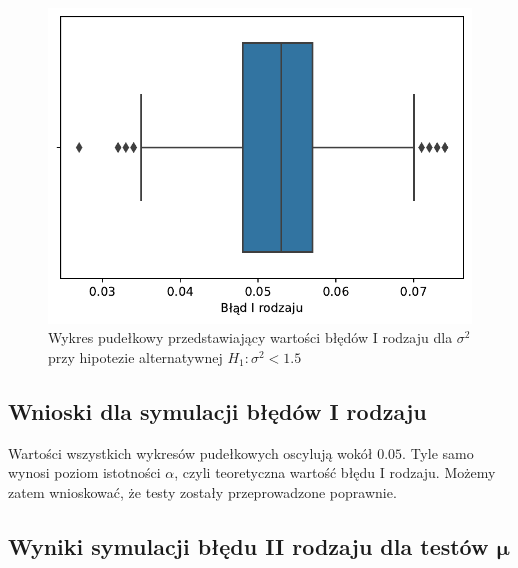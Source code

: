 \documentclass[12pt]{mwart}
\begin{document}
	
	\begin{figure}[H]
	\begin{center}
		\includegraphics[scale=0.6]{box6.pdf}
		\caption{Wykres pudełkowy przedstawiający wartości błędów I rodzaju dla $\sigma^2$ przy hipotezie alternatywnej $H_1 \colon \sigma^2 < 1.5$}
	\end{center}
	\end{figure}
	
	
	\subsection{Wnioski dla symulacji błędów I rodzaju}
	\noindent Wartości wszystkich wykresów pudełkowych oscylują wokół $0.05$. Tyle samo wynosi poziom istotności $\alpha$, czyli teoretyczna wartość błędu I rodzaju. Możemy zatem wnioskować, że testy zostały przeprowadzone poprawnie.
	
	
	
	\subsection{Wyniki symulacji błędu II rodzaju dla testów $\bm{\mu}$}
	
\end{document}
